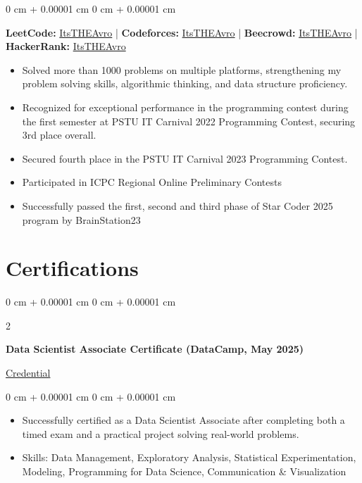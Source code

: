 \documentclass[10pt, letterpaper]{article}
\newenvironment{highlights}{
    \begin{itemize}[
        topsep=0.10 cm,
        parsep=0.10 cm,
        partopsep=0pt,
        itemsep=0pt,
        leftmargin=0 cm + 10pt
    ]
}{
    \end{itemize}
} %
\newenvironment{onecolentry}{
    \begin{adjustwidth}{
        0 cm + 0.00001 cm
    }{
        0 cm + 0.00001 cm
    }
}{
    \end{adjustwidth}
} %
\newenvironment{twocolentry}[2][]{
    \onecolentry
    \def\secondColumn{#2}
    \setcolumnwidth{\fill, 4.5 cm}
    \begin{paracol}{2}
}{
    \switchcolumn \raggedleft \secondColumn
    \end{paracol}
    \endonecolentry
} %
\begin{document}
        \begin{onecolentry}
    
           \begin{center}
            \textbf{LeetCode: }\href{https://leetcode.com/u/ItsTHEAvro/}{ItsTHEAvro}
            |
            \textbf{Codeforces: }\href{https://codeforces.com/profile/ItsTHEAvro/}{ItsTHEAvro}
            |
            \textbf{Beecrowd: }\href{https://judge.beecrowd.com/en/profile/260423}{ItsTHEAvro}
            |
            \textbf{HackerRank: }\href{https://www.hackerrank.com/profile/ItsTHEAvro}{ItsTHEAvro} 
           \end{center}
           \vspace{0.1 cm}

           \begin{highlights}
                \item Solved more than 1000 problems on multiple platforms, strengthening my problem solving skills, algorithmic thinking, and data structure proficiency.
                \item Recognized for exceptional performance in the programming contest during the first semester at PSTU IT Carnival 2022 Programming Contest, securing 3rd place overall.
                \item Secured fourth place in the PSTU IT Carnival 2023 Programming Contest.
                \item Participated in ICPC Regional Online Preliminary Contests
                \item Successfully passed the first, second and third phase of Star Coder 2025 program by BrainStation23
            \end{highlights}

        \end{onecolentry}
 \section{Certifications}

 \begin{twocolentry}
    {\href{https://www.datacamp.com/certificate/DSA0011426465213}{Credential}}
    \textbf{Data Scientist Associate Certificate (DataCamp, May 2025)}
\end{twocolentry}
\vspace{0.10 cm}

\begin{onecolentry}
    \begin{highlights}
        \item Successfully certified as a Data Scientist Associate after completing both a timed exam and a practical project solving real-world problems.
        \item Skills: Data Management, Exploratory Analysis, Statistical Experimentation, Modeling, Programming for Data Science, Communication \& Visualization
    \end{highlights}
\end{onecolentry}
\vspace{0.2 cm}
\end{document}

